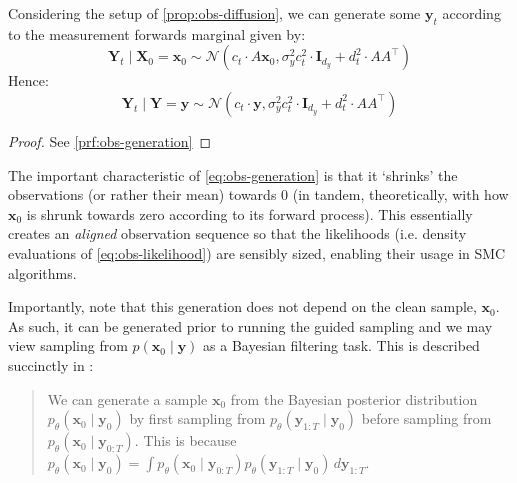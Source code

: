 \begin{proposition} \label{prop:obs-generation}
    Considering the setup of \ref{prop:obs-diffusion}, we can generate some $\mathbf{y}_t$ according
    to the measurement forwards marginal given by:
    \begin{equation*}
        \mathbf{Y}_t \mid \mathbf{X}_0 = \mathbf{x}_0 \sim \mathcal{N}(c_t\cdot A\mathbf{x}_0, \sigma_y^2c_t^2\cdot\mathbf{I}_{d_y} + d_t^2\cdot AA^\top)
    \end{equation*}
    Hence:
    \begin{equation}
        \mathbf{Y}_t \mid \mathbf{Y} = \mathbf{y} \sim \mathcal{N}(c_t\cdot \mathbf{y}, \sigma_y^2c_t^2\cdot\mathbf{I}_{d_y} + d_t^2\cdot AA^\top) \label{eq:obs-generation}
    \end{equation}
\end{proposition}

\begin{proof}
    See \ref{prf:obs-generation}
\end{proof}

\begin{remark}[Shrinking] \label{rem:shrinking}
    The important characteristic of \ref{eq:obs-generation} is that it `shrinks' the
    observations (or rather their mean) towards 0 (in tandem, theoretically, with how $\mathbf{x}_0$
    is shrunk towards zero according to its forward process). This essentially creates an
    \emph{aligned} observation sequence so that the likelihoods (i.e. density evaluations of
    \ref{eq:obs-likelihood}) are sensibly sized, enabling their usage in SMC algorithms.
\end{remark}

Importantly, note that this generation does not depend on the clean sample, $\mathbf{x}_0$. As such,
it can be generated prior to running the guided sampling and we may view sampling from
$p(\mathbf{x}_0 \mid \mathbf{y})$ as a Bayesian filtering task. This is described succinctly in
\textcite{douDiffusionPosteriorSampling2023}:
\begin{quote}
    We can generate a sample $\mathbf{x}_0$ from the Bayesian posterior distribution
    $p_\theta(\mathbf{x}_0 \mid \mathbf{y}_0)$ by first sampling from
    $p_\theta(\mathbf{y}_{1:T} \mid \mathbf{y}_0)$ before sampling from
    $p_\theta(\mathbf{x}_0 \mid \mathbf{y}_{0:T})$. This is because
    $p_\theta(\mathbf{x}_0 \mid \mathbf{y}_0) = \int p_\theta(\mathbf{x}_0 \mid \mathbf{y}_{0:T})p_\theta(\mathbf{y}_{1:T} \mid \mathbf{y}_0)\, d\mathbf{y}_{1:T}$.
\end{quote}

